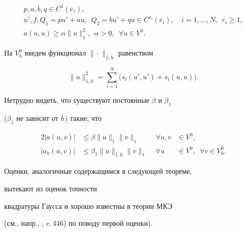 \begin{gather} \label{glad}


p, a, b, q \in C^{1}(\overline {e}_i), \\


%


\label{glad2}


u', f, Q_1=pu'+au,\ \ Q_2= bu'+qu \in C^{r_i}(\overline


e_i), \quad i=1,\dotsc,N,\ \ r_i\ge 1, \\


%


\label{pop}


a(u,u) \ge \alpha \|u\|^2_{1},\ \ \alpha >0, \ \; \forall u\in V^0.


\end{gather}


На $V_h^0$ введем функционал $\|\cdot \|_{1,h}$ равенством


$$


\|u\|^2_{1,h} =\sum_{i=1}^N  \big(s_i(u',u')+s_i(u,u) \big).


$$


Нетрудно видеть, что существуют постоянные $\beta $ и $\beta_1$


($\beta_1 $ не зависит от $h$) такие, что


\begin{alignat*}{2}




| a(u,v) | &\le \beta \|u\|_{1}\|v\|_{1} &\ \ \forall u,v &\in V^0, \\


%




|a_h(u,v) | &\le \beta_1 \|u\|_{1,h} \|v\|_{1} & \ \ \forall u&\in V^0,


\ \; \forall v \in V_h^0.


\end{alignat*}


Оценки, аналогичные содержащимся в следующей теореме, 


вытекают из оценок точности


квадратуры Гаусса и хорошо известны в теории МКЭ


(см., напр., \cite{Ciarlet}, c.\,446) по поводу первой оценки).





